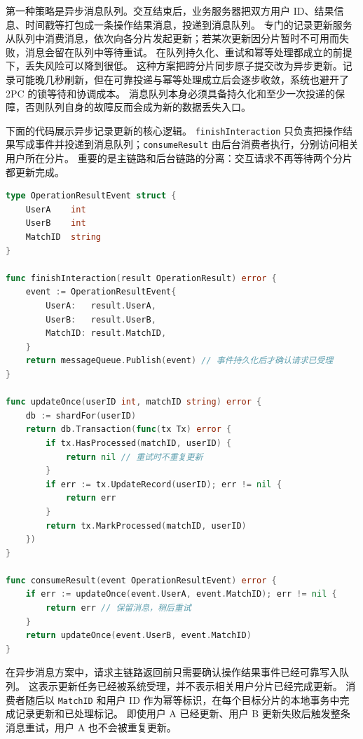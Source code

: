第一种策略是异步消息队列。交互结束后，业务服务器把双方用户 ID、结果信息、时间戳等打包成一条操作结果消息，投递到消息队列。
专门的记录更新服务从队列中消费消息，依次向各分片发起更新；若某次更新因分片暂时不可用而失败，消息会留在队列中等待重试。
在队列持久化、重试和幂等处理都成立的前提下，丢失风险可以降到很低。
这种方案把跨分片同步原子提交改为异步更新。记录可能晚几秒刷新，但在可靠投递与幂等处理成立后会逐步收敛，系统也避开了 2PC 的锁等待和协调成本。
消息队列本身必须具备持久化和至少一次投递的保障，否则队列自身的故障反而会成为新的数据丢失入口。

下面的代码展示异步记录更新的核心逻辑。
\texttt{finishInteraction} 只负责把操作结果写成事件并投递到消息队列；\texttt{consumeResult} 由后台消费者执行，分别访问相关用户所在分片。
重要的是主链路和后台链路的分离：交互请求不再等待两个分片都更新完成。

\begin{tcolorbox}[title=异步记录更新的核心逻辑]
\begin{lstlisting}[style=codeblock, language=go]
type OperationResultEvent struct {
    UserA    int
    UserB    int
    MatchID  string
}

func finishInteraction(result OperationResult) error {
    event := OperationResultEvent{
        UserA:   result.UserA,
        UserB:   result.UserB,
        MatchID: result.MatchID,
    }
    return messageQueue.Publish(event) // 事件持久化后才确认请求已受理
}

func updateOnce(userID int, matchID string) error {
    db := shardFor(userID)
    return db.Transaction(func(tx Tx) error {
        if tx.HasProcessed(matchID, userID) {
            return nil // 重试时不重复更新
        }
        if err := tx.UpdateRecord(userID); err != nil {
            return err
        }
        return tx.MarkProcessed(matchID, userID)
    })
}

func consumeResult(event OperationResultEvent) error {
    if err := updateOnce(event.UserA, event.MatchID); err != nil {
        return err // 保留消息，稍后重试
    }
    return updateOnce(event.UserB, event.MatchID)
}
\end{lstlisting}
\end{tcolorbox}

在异步消息方案中，请求主链路返回前只需要确认操作结果事件已经可靠写入队列。
这表示更新任务已经被系统受理，并不表示相关用户分片已经完成更新。
消费者随后以 \texttt{MatchID} 和用户 ID 作为幂等标识，在每个目标分片的本地事务中完成记录更新和已处理标记。
即使用户 A 已经更新、用户 B 更新失败后触发整条消息重试，用户 A 也不会被重复更新。

